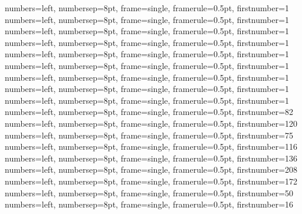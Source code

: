 {numbers=left, numbersep=8pt, frame=single, framerule=0.5pt, firstnumber=1}
{numbers=left, numbersep=8pt, frame=single, framerule=0.5pt, firstnumber=1}
{numbers=left, numbersep=8pt, frame=single, framerule=0.5pt, firstnumber=1}
{numbers=left, numbersep=8pt, frame=single, framerule=0.5pt, firstnumber=1}
{numbers=left, numbersep=8pt, frame=single, framerule=0.5pt, firstnumber=1}
{numbers=left, numbersep=8pt, frame=single, framerule=0.5pt, firstnumber=1}
{numbers=left, numbersep=8pt, frame=single, framerule=0.5pt, firstnumber=1}
{numbers=left, numbersep=8pt, frame=single, framerule=0.5pt, firstnumber=1}
{numbers=left, numbersep=8pt, frame=single, framerule=0.5pt, firstnumber=1}
{numbers=left, numbersep=8pt, frame=single, framerule=0.5pt, firstnumber=82}
{numbers=left, numbersep=8pt, frame=single, framerule=0.5pt, firstnumber=120}
{numbers=left, numbersep=8pt, frame=single, framerule=0.5pt, firstnumber=75}
{numbers=left, numbersep=8pt, frame=single, framerule=0.5pt, firstnumber=116}
{numbers=left, numbersep=8pt, frame=single, framerule=0.5pt, firstnumber=136}
{numbers=left, numbersep=8pt, frame=single, framerule=0.5pt, firstnumber=208}
{numbers=left, numbersep=8pt, frame=single, framerule=0.5pt, firstnumber=172}
{numbers=left, numbersep=8pt, frame=single, framerule=0.5pt, firstnumber=50}
{numbers=left, numbersep=8pt, frame=single, framerule=0.5pt, firstnumber=16}
